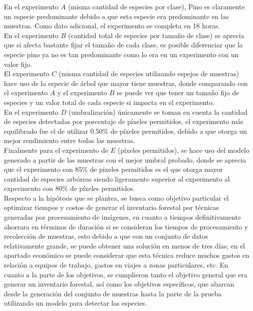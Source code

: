 \documentclass[review]{elsarticle}
\begin{document}
En el experimento $A$ (misma cantidad de especies por clase), Pino es claramente un especie predominante debido a que esta especie era predominante en las muestras. Como dato adicional, el experimento se completa en 18 horas.\\

En el experimento $B$ (cantidad total de especies por tamaño de clase) se aprecia que si afecta bastante fijar el tamaño de cada clase, es posible diferenciar que la especie pino ya no es tan predominante como lo era en un experimento con un valor fijo.\\

El experimento $C$ (misma cantidad de especies utilizando espejos de muestras) hace uso de la especie de árbol que mayor tiene muestras, donde comparando con el experimento $A$ y el experimento $B$ se puede ver  que tener un tamaño fijo de especies y un valor total de cada especie si impacta en el experimento.\\

En el experimento $D$ (umbralización) únicamente se toman en cuenta la cantidad de especies detectadas por porcentaje de píxeles permitidos, el experimento más equilibrado fue el de utilizar 0.50\% de píxeles permitidos, debido a que otorga un mejor rendimiento entre todas las muestras.\\

Finalmente para el experimento de $E$ (píxeles permitidos), se hace uso del modelo generado a partir de las muestras con el mejor umbral probado, donde se aprecia que el experimento con 85\% de pixeles permitidos es el que otorga mayor cantidad de especies arbóreas siendo ligeramente superior al experimento al experimento con 80\% de píxeles permitidos.\\

Respecto a la hipótesis que se plantea, se busca como objetivo particular el optimizar tiempos y costos de generar el inventario forestal por técnicas generadas por procesamiento de imágenes, en cuanto a tiempos definitivamente ahorrara en términos de duración si se consideran los tiempos de procesamiento y recolección de muestras, esto debido a que con un conjunto de datos relativamente grande, se puede obtener una solución en menos de tres días; en el apartado económico se puede considerar que esta técnica reduce muchos gastos en relación a equipos de trabajo, gastos en viajes a zonas particulares, etc. En cuanto a la parte de los objetivos, se cumplieron tanto el objetivo general que era generar un inventario forestal, así como los objetivos específicos, que abarcan desde la generación del conjunto de muestras hasta la parte de la prueba utilizando un modelo para detectar las especies.
\clearpage
\end{document}
